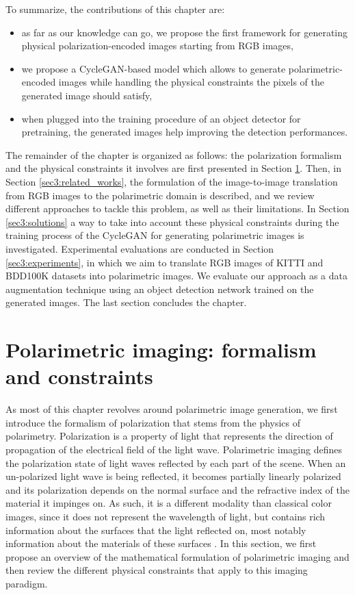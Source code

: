 To summarize, the contributions of this chapter are:
\vspace{-10px}
\begin{itemize}
	\itemsep0em
	\item as far as our knowledge can go, we propose the first framework for generating physical polarization-encoded images starting from RGB images, 
	\item we propose a \ac{CycleGAN}-based model which allows to generate polarimetric-encoded images while handling the physical constraints the pixels of the generated image should satisfy,
	\item when plugged into the training procedure of an object detector for pretraining, the generated images help improving the detection performances.
\end{itemize}

The remainder of the chapter is organized as follows:  the polarization formalism and the physical constraints it involves are first presented in Section \ref{sec3:physical_prop}. Then, in Section \ref{sec3:related_works}, the formulation of the image-to-image translation from \ac{RGB} images to the polarimetric domain is described, and we review different approaches to tackle this problem, as well as their limitations. In Section \ref{sec3:solutions} a way to take into account these physical constraints during the training process of the CycleGAN for generating polarimetric images is investigated. Experimental evaluations are conducted in Section \ref{sec3:experiments}, in which we aim to translate RGB images of KITTI and BDD100K datasets into polarimetric images. We evaluate our approach as a data augmentation technique using an object detection network trained on the generated images. The last section concludes the chapter.


\section{Polarimetric imaging: formalism and constraints}
\label{sec3:physical_prop}

As most of this chapter revolves around polarimetric image generation, we first introduce the formalism of polarization that stems from the physics of polarimetry.  Polarization is a property of light that represents the direction of propagation of the electrical field of the light wave. Polarimetric imaging defines the polarization state of light waves reflected by each part of the scene. When an un-polarized light wave is being reflected, it becomes partially linearly polarized and its polarization depends on the normal surface  and the refractive index of the material it impinges on. As such, it is a different modality than classical color images, since it does not represent the wavelength of light, but contains rich information about the surfaces that the light reflected on, most notably information about the materials of these surfaces \citep{Gross2012}. In this section, we first propose an overview of the mathematical formulation of polarimetric imaging and then review the different physical constraints that apply to this imaging paradigm.

